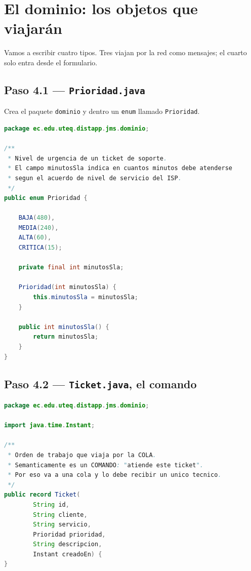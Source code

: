 \documentclass[11pt,a4paper]{book}
\newcommand{\clase}[1]{\texttt{#1}}
\newcommand{\ruta}[1]{\texttt{#1}}
\begin{document}
\chapter{El dominio: los objetos que viajarán}
\label{cap:dominio}

Vamos a escribir cuatro tipos.
Tres viajan por la red como mensajes; el cuarto solo entra desde el formulario.

\section{Paso 4.1 --- \texttt{Prioridad.java}}

Crea el paquete \ruta{dominio} y dentro un \texttt{enum} llamado \clase{Prioridad}.

\begin{lstlisting}[language=Java,caption={\ruta{dominio/Prioridad.java}},label={lst:cprioridad}]
package ec.edu.uteq.distapp.jms.dominio;

/**
 * Nivel de urgencia de un ticket de soporte.
 * El campo minutosSla indica en cuantos minutos debe atenderse
 * segun el acuerdo de nivel de servicio del ISP.
 */
public enum Prioridad {

	BAJA(480),
	MEDIA(240),
	ALTA(60),
	CRITICA(15);

	private final int minutosSla;

	Prioridad(int minutosSla) {
		this.minutosSla = minutosSla;
	}

	public int minutosSla() {
		return minutosSla;
	}
}
\end{lstlisting}

\section{Paso 4.2 --- \texttt{Ticket.java}, el comando}

\begin{lstlisting}[language=Java,caption={\ruta{dominio/Ticket.java}},label={lst:cticket}]
package ec.edu.uteq.distapp.jms.dominio;

import java.time.Instant;

/**
 * Orden de trabajo que viaja por la COLA.
 * Semanticamente es un COMANDO: "atiende este ticket".
 * Por eso va a una cola y lo debe recibir un unico tecnico.
 */
public record Ticket(
		String id,
		String cliente,
		String servicio,
		Prioridad prioridad,
		String descripcion,
		Instant creadoEn) {
}
\end{lstlisting}
\end{document}
